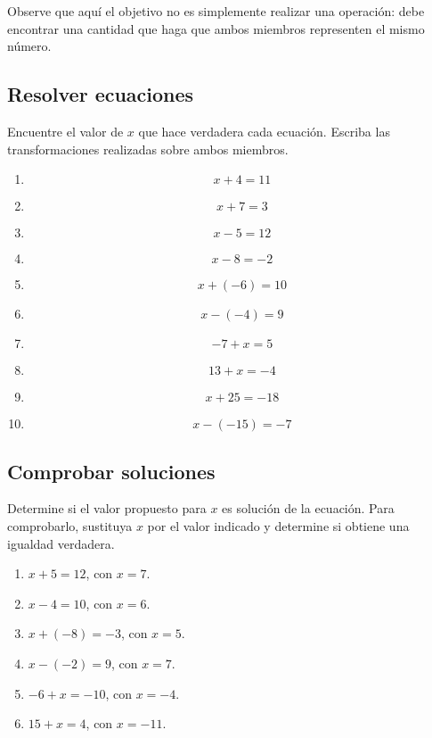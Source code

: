 Observe que aquí el objetivo no es simplemente realizar una operación: debe encontrar una cantidad que haga que ambos miembros representen el mismo número.

\subsection*{Resolver ecuaciones}

Encuentre el valor de \(x\) que hace verdadera cada ecuación. Escriba las transformaciones realizadas sobre ambos miembros.

\begin{enumerate}
\item

\[
x+4=11
\]

\item

\[
x+7=3
\]

\item

\[
x-5=12
\]

\item

\[
x-8=-2
\]

\item

\[
x+(-6)=10
\]

\item

\[
x-(-4)=9
\]

\item

\[
-7+x=5
\]

\item

\[
13+x=-4
\]

\item

\[
x+25=-18
\]

\item

\[
x-(-15)=-7
\]

\end{enumerate}

\subsection*{Comprobar soluciones}

Determine si el valor propuesto para \(x\) es solución de la ecuación. Para comprobarlo, sustituya \(x\) por el valor indicado y determine si obtiene una igualdad verdadera.

\begin{enumerate}
\item \(x+5=12\), con \(x=7\).

\item \(x-4=10\), con \(x=6\).

\item \(x+(-8)=-3\), con \(x=5\).

\item \(x-(-2)=9\), con \(x=7\).

\item \(-6+x=-10\), con \(x=-4\).

\item \(15+x=4\), con \(x=-11\).
\end{enumerate}
